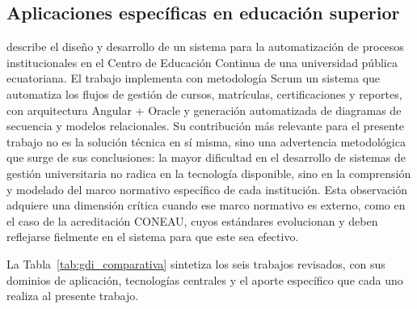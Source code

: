 \subsection{Aplicaciones específicas en educación superior}

\citet{cruz2024diseno} describe el diseño y desarrollo de un sistema para la automatización de procesos institucionales en el Centro de Educación Continua de una universidad pública ecuatoriana. El trabajo implementa con metodología Scrum un sistema que automatiza los flujos de gestión de cursos, matrículas, certificaciones y reportes, con arquitectura Angular + Oracle y generación automatizada de diagramas de secuencia y modelos relacionales. Su contribución más relevante para el presente trabajo no es la solución técnica en sí misma, sino una advertencia metodológica que surge de sus conclusiones: la mayor dificultad en el desarrollo de sistemas de gestión universitaria no radica en la tecnología disponible, sino en la comprensión y modelado del marco normativo específico de cada institución. Esta observación adquiere una dimensión crítica cuando ese marco normativo es externo, como en el caso de la acreditación CONEAU, cuyos estándares evolucionan y deben reflejarse fielmente en el sistema para que este sea efectivo.

La Tabla~\ref{tab:gdi_comparativa} sintetiza los seis trabajos revisados, con sus dominios de aplicación, tecnologías centrales y el aporte específico que cada uno realiza al presente trabajo.

